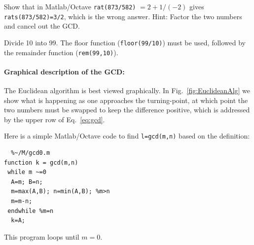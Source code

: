 \documentclass{ximera}
\begin{document}
\EEx

\BEx %
Show that in Matlab/Octave \texttt{rat(873/582)} $= 2+1/(-2)$
gives \texttt{rats(873/582)=3/2}, which is the wrong answer.
Hint: Factor the two numbers and cancel out the GCD.

\EEx	

\BEx %
Divide 10 into 99. The floor function (\texttt{floor(99/10)}) must be used, followed by the
remainder function (\texttt{rem(99,10)}).

\EEx

\paragraph{Graphical description of the GCD:} 
The Euclidean algorithm is best viewed graphically. In Fig.~\ref{fig:EuclideanAlg} we show what is
happening as one approaches the turning-point, at which point the two numbers must be swapped to keep
the difference positive, which is addressed by the upper row of Eq.~\ref{eq:gcd}.

Here is a simple Matlab/Octave code to find \texttt{l=gcd(m,n)} based on the \citet{JS10}
definition:
\begin{verbatim}  %~/M/gcd0.m
function k = gcd(m,n)
 while m ~=0
  A=m; B=n;
  m=max(A,B); n=min(A,B); %m>n
  m=m-n;
 endwhile %m=n
  k=A;
\end{verbatim}
This program loops until $m=0$.


\end{document}
